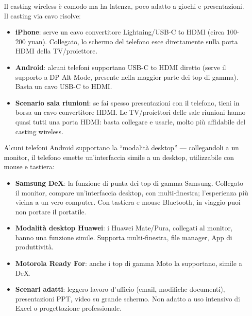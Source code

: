 
Il casting wireless è comodo ma ha latenza, poco adatto a giochi e presentazioni. Il casting via cavo risolve:

\begin{itemize}
  \item \textbf{iPhone}: serve un cavo convertitore Lightning/USB-C to HDMI (circa 100-200 yuan). Collegato, lo schermo del telefono esce direttamente sulla porta HDMI della TV/proiettore.
  \item \textbf{Android}: alcuni telefoni supportano USB-C to HDMI diretto (serve il supporto a DP Alt Mode, presente nella maggior parte dei top di gamma). Basta un cavo USB-C to HDMI.
  \item \textbf{Scenario sala riunioni}: se fai spesso presentazioni con il telefono, tieni in borsa un cavo convertitore HDMI. Le TV/proiettori delle sale riunioni hanno quasi tutti una porta HDMI: basta collegare e usarle, molto più affidabile del casting wireless.
\end{itemize}


Alcuni telefoni Android supportano la “modalità desktop” — collegandoli a un monitor, il telefono emette un'interfaccia simile a un desktop, utilizzabile con mouse e tastiera:

\begin{itemize}
  \item \textbf{Samsung DeX}: la funzione di punta dei top di gamma Samsung. Collegato il monitor, compare un'interfaccia desktop, con multi-finestra; l'esperienza più vicina a un vero computer. Con tastiera e mouse Bluetooth, in viaggio puoi non portare il portatile.
  \item \textbf{Modalità desktop Huawei}: i Huawei Mate/Pura, collegati al monitor, hanno una funzione simile. Supporta multi-finestra, file manager, App di produttività.
  \item \textbf{Motorola Ready For}: anche i top di gamma Moto la supportano, simile a DeX.
  \item \textbf{Scenari adatti}: leggero lavoro d'ufficio (email, modifiche documenti), presentazioni PPT, video su grande schermo. Non adatto a uso intensivo di Excel o progettazione professionale.
\end{itemize}



